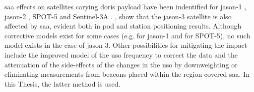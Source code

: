 \gls{saa} effects on satellites carying \gls{doris} payload have been indentified 
for \gls{jason}-1 \cite{Willis2003}, \gls{jason}-2 \cite{Willis2016b}, SPOT-5 \cite{Stepanek2013} 
and Sentinel-3A \cite{Jalabert2018}. \cite{Capdeville2016}, show that the \gls{jason}-3 
satellite is also affected by \gls{saa}, evident both in \gls{pod} and station positioning 
results. Although corrective models exist for some cases (e.g. for \gls{jason}-1 
\cite{Lemoine2006} and \cite{Capdeville2016} for SPOT-5), no such model exists 
in the case of \gls{jason}-3. Other possibilities for mitigating the impact include the 
improved model of the \gls{uso} frequency to correct the data and the attenuation 
of the side-effects of the changes in the \gls{uso} by downweighting or eliminating 
measurements from beacons placed within the region covered \gls{saa}. In this Thesis, 
the latter method is used.
